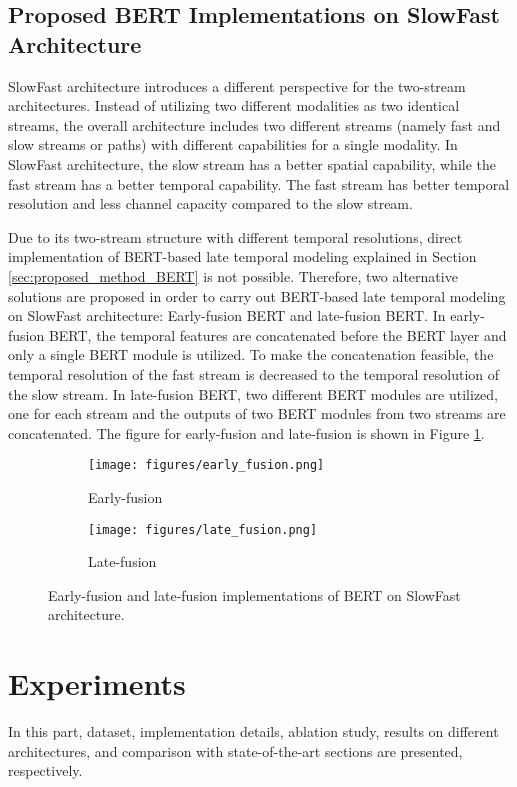 \documentclass[runningheads]{llncs}
\begin{document}
\subsection{Proposed BERT Implementations on SlowFast Architecture}
\label{sec:proposed_method_bert_slowfast}
SlowFast architecture \cite{Feichtenhofer2019SlowfastRecognition} introduces a different perspective for the two-stream architectures. Instead of utilizing two different modalities as two identical streams, the overall architecture includes two different streams (namely fast and slow streams or paths) with different capabilities for a single modality. In SlowFast architecture, the slow stream has a better spatial capability, while the fast stream has a better temporal capability. The fast stream has better temporal resolution and less channel capacity compared to the slow stream. 

Due to its two-stream structure with different temporal resolutions, direct implementation of BERT-based late temporal modeling explained in Section \ref{sec:proposed_method_BERT} is not possible. Therefore, two alternative solutions are proposed in order to carry out BERT-based late temporal modeling on SlowFast architecture: Early-fusion BERT and late-fusion BERT. In early-fusion BERT, the temporal features are concatenated before the BERT layer and only a single BERT module is utilized. To make the concatenation feasible, the temporal resolution of the fast stream is decreased to the temporal resolution of the slow stream. In late-fusion BERT, two different BERT modules are utilized, one for each stream and the outputs of two BERT modules from two streams are concatenated. The figure for early-fusion and late-fusion is shown in Figure \ref{fig:bert_slowfast}.


\begin{figure}[t]
	\centering
	\begin{subfigure}[b]{0.8\textwidth}{
    	\texttt{[image: figures/early\_fusion.png]}}
    \caption{Early-fusion}
	\end{subfigure}
	
	
	\begin{subfigure}[b]{0.8\textwidth}{
    	\texttt{[image: figures/late\_fusion.png]}}
    \caption{Late-fusion}
	\end{subfigure}
	\caption{Early-fusion and late-fusion implementations of BERT on SlowFast architecture.}
	\label{fig:bert_slowfast}
\end{figure}

 \section{Experiments}
In this part, dataset, implementation details, ablation study, results on different architectures, and comparison with state-of-the-art sections are presented, respectively.
\end{document}

